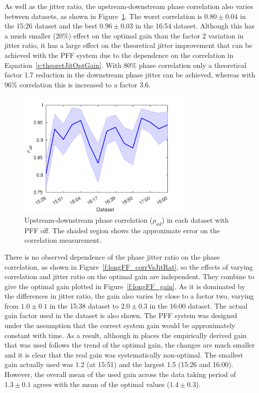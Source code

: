 As well as the jitter ratio, the upstream-downstream phase correlation also varies between datasets, as shown in Figure~\ref{f:longFF_corrFFOff}. The worst correlation is \(0.80\pm0.04\) in the 15:26 dataset and the best \(0.96\pm0.03\) in the 16:54 dataset. Although this has a much smaller (20\%) effect on the optimal gain than the factor 2 variation in jitter ratio, it has a large effect on the theoretical jitter improvement that can be achieved with the PFF system due to the dependence on the correlation in Equation~\ref{e:theoretJitOptGain}. With 80\% phase correlation only a theoretical factor 1.7 reduction in the downstream phase jitter can be achieved, whereas with 96\% correlation this is increased to a factor 3.6.

\begin{figure}
  \centering
  \includegraphics[width=0.75\textwidth]{Figures/feedforward/longFF_corrFFOff}
  \caption{Upstream-downstream phase correlation (\(\rho_{ud}\)) in each dataset with PFF off. The shaded region shows the approximate error on the correlation measurement.}
  \label{f:longFF_corrFFOff}
\end{figure}

There is no observed dependence of the phase jitter ratio on the phase correlation, as shown in Figure~\ref{f:longFF_corrVsJitRat}, so the effects of varying correlation and jitter ratio on the optimal gain are independent. They combine to give the optimal gain plotted in Figure~\ref{f:longFF_gain}. As it is dominated by the differences in jitter ratio, the gain also varies by close to a factor two, varying from \(1.0\pm0.1\) in the 15:38 dataset to \(2.0\pm0.3\) in the 16:00 dataset. The actual gain factor used in the dataset is also shown.
The PFF system was designed under the assumption that the correct system gain would be approximately constant with time.
As a result, although in places the empirically derived gain that was used follows the trend of the optimal gain, the changes are much smaller and it is clear that the real gain was systematically non-optimal. 
The smallest gain actually used was 1.2 (at 15:51) and the largest 1.5 (15:26 and 16:00). However, the overall mean of the used gain across the data taking period of \(1.3\pm0.1\) agrees with the mean of the optimal values (\(1.4\pm0.3\)). 

